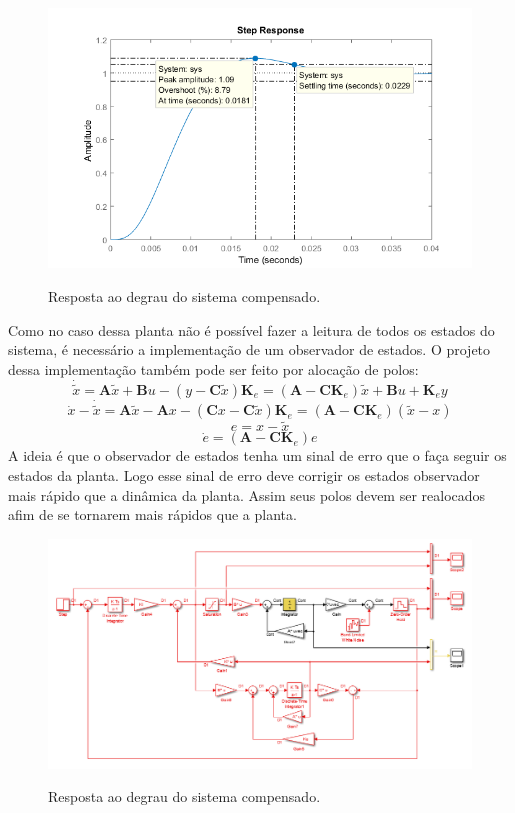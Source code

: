\documentclass[
	article,			%
	11pt,				%
	oneside,			%
	a4paper,			%
	english,			%
	brazil,				%
	sumario=tradicional
	]{abntex2}
\begin{document}
\begin{figure}[htb!]
	\centering
	\caption{Resposta ao degrau do sistema compensado.}
	\includegraphics[scale=0.8]{./img/stepCtrl_1.png}
	\label{fig:stepCtrl_1}
\end{figure}

\pagebreak

Como no caso dessa planta não é possível fazer a leitura de todos os estados do sistema, é necessário a implementação de um observador de estados. O projeto dessa implementação também pode ser feito por alocação de polos:
$$
\dot{\tilde{x}}=
\textbf{A}\tilde{x} + \textbf{B}u - (y - \textbf{C}\tilde{x})\textbf{K}_e=
(\textbf{A} - \textbf{C}\textbf{K}_e)\tilde{x} + \textbf{B}u + \textbf{K}_ey
$$
$$
\dot{x} - \dot{\tilde{x}}=
\textbf{A}\tilde{x} - \textbf{A}x - (\textbf{C}x - \textbf{C}\tilde{x})\textbf{K}_e=
(\textbf{A} - \textbf{C}\textbf{K}_e)(\tilde{x} - x)
$$
$$
e = x - \tilde{x}
$$
$$
\dot{e} = (\textbf{A} - \textbf{C}\textbf{K}_e)e
$$
A ideia é que o observador de estados tenha um sinal de erro que o faça seguir os estados da planta. Logo esse sinal de erro deve corrigir os estados observador mais rápido que a dinâmica da planta. Assim seus polos devem ser realocados afim de se tornarem mais rápidos que a planta. 

\begin{figure}[htb!]
	\centering
	\caption{Resposta ao degrau do sistema compensado.}
	\includegraphics[scale=0.6]{./img/simulink_esquematicoCtrlObs.PNG}
	\label{fig:simulink_esquematicoCtrlObs}
\end{figure}
\end{document}
